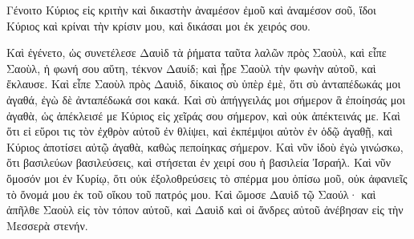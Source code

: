 {Γένοιτο Κύριος εἰς κριτὴν καὶ δικαστὴν ἀναμέσον ἐμοῦ καὶ ἀναμέσον σοῦ, ἴδοι Κύριος καὶ κρίναι τὴν κρίσιν μου, καὶ δικάσαι μοι ἐκ χειρός σου.
\par }{\PP {}Καὶ ἐγένετο, ὡς συνετέλεσε Δαυὶδ τὰ ῥήματα ταῦτα λαλῶν πρὸς Σαοὺλ, καὶ εἶπε Σαοὺλ, ἡ φωνή σου αὕτη, τέκνον Δαυίδ; καὶ ᾖρε Σαοὺλ τὴν φωνὴν αὐτοῦ, καὶ ἔκλαυσε.
Καὶ εἶπε Σαοὺλ πρὸς Δαυὶδ, δίκαιος σὺ ὑπὲρ ἐμὲ, ὅτι σὺ ἀνταπέδωκάς μοι ἀγαθά, ἐγὼ δὲ ἀνταπέδωκά σοι κακά.
Καὶ σὺ ἀπήγγειλάς μοι σήμερον ἃ ἐποίησάς μοι ἀγαθὰ, ὡς ἀπέκλεισέ με Κύριος εἰς χεῖράς σου σήμερον, καὶ οὐκ ἀπέκτεινάς με.
Καὶ ὅτι εἰ εὕροι τις τὸν ἐχθρὸν αὐτοῦ ἐν θλίψει, καὶ ἐκπέμψοι αὐτὸν ἐν ὁδῷ ἀγαθῇ, καὶ Κύριος ἀποτίσει αὐτῷ ἀγαθὰ, καθὼς πεποίηκας σήμερον.
Καὶ νῦν ἰδοὺ ἐγὼ γινώσκω, ὅτι βασιλεύων βασιλεύσεις, καὶ στήσεται ἐν χειρί σου ἡ βασιλεία Ἰσραήλ.
Καὶ νῦν ὄμοσόν μοι ἐν Κυρίῳ, ὅτι οὐκ ἐξολοθρεύσεις τὸ σπέρμα μου ὀπίσω μοῦ, οὐκ ἀφανιεῖς τὸ ὄνομά μου ἐκ τοῦ οἴκου τοῦ πατρός μου.
Καὶ ὤμοσε Δαυὶδ τῷ Σαούλ· καὶ ἀπῆλθε Σαοὺλ εἰς τὸν τόπον αὐτοῦ, καὶ Δαυὶδ καὶ οἱ ἄνδρες αὐτοῦ ἀνέβησαν εἰς τὴν Μεσσερὰ στενήν.

}
